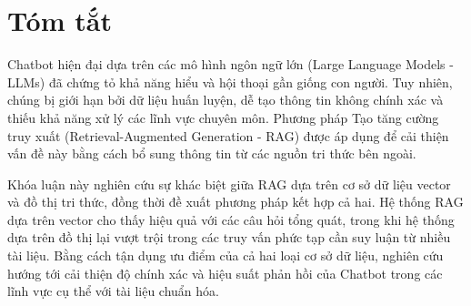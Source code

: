 \chapter*{Tóm tắt}
Chatbot hiện đại dựa trên các mô hình ngôn ngữ lớn (Large Language Models - LLMs) đã chứng tỏ khả năng hiểu và hội thoại gần giống con người. Tuy nhiên, chúng bị giới hạn bởi dữ liệu huấn luyện, dễ tạo thông tin không chính xác và thiếu khả năng xử lý các lĩnh vực chuyên môn. Phương pháp Tạo tăng cường truy xuất (Retrieval-Augmented Generation - RAG) được áp dụng để cải thiện vấn đề này bằng cách bổ sung thông tin từ các nguồn tri thức bên ngoài.

Khóa luận này nghiên cứu sự khác biệt giữa RAG dựa trên cơ sở dữ liệu vector và đồ thị tri thức, đồng thời đề xuất phương pháp kết hợp cả hai. Hệ thống RAG dựa trên vector cho thấy hiệu quả với các câu hỏi tổng quát, trong khi hệ thống dựa trên đồ thị lại vượt trội trong các truy vấn phức tạp cần suy luận từ nhiều tài liệu. Bằng cách tận dụng ưu điểm của cả hai loại cơ sở dữ liệu, nghiên cứu hướng tới cải thiện độ chính xác và hiệu suất phản hồi của Chatbot trong các lĩnh vực cụ thể với tài liệu chuẩn hóa.